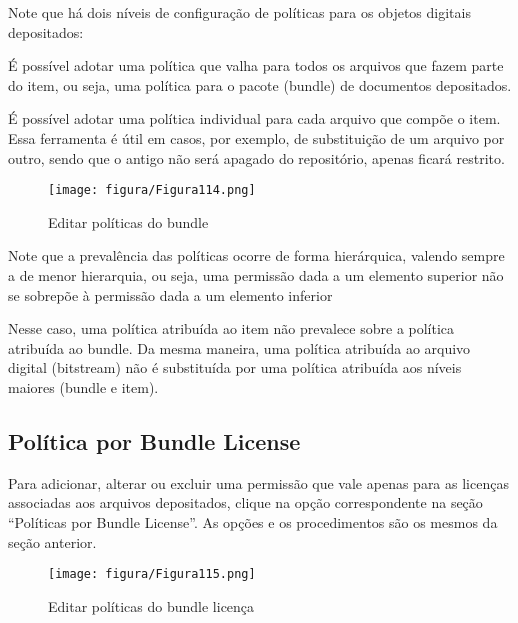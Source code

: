 \documentclass[12pt,hidelinks]{article}
\begin{document}
    \singlespacing
    
    Note que há dois níveis de configuração de políticas para os objetos digitais depositados:
    
    \singlespacing
    
    \textbullet \hspace{6pt} É possível adotar uma política que valha para todos os arquivos que fazem parte do item, ou seja, uma política para o pacote (bundle) de documentos depositados. 
    
    \singlespacing
    
    \textbullet \hspace{6pt} É possível adotar uma política individual para cada arquivo que compõe o item. Essa ferramenta é útil em casos, por exemplo, de substituição de um arquivo por outro, sendo que o antigo não será apagado do repositório, apenas ficará restrito.

    \begin{figure}[!htp]
                \centering
                \texttt{[image: figura/Figura114.png]}
                \caption{Editar políticas do bundle}
            \label{Rotulo}
        \end{figure}

    Note que a prevalência das políticas ocorre de forma hierárquica, valendo sempre a de menor hierarquia, ou seja, uma permissão dada a um elemento superior não se sobrepõe à permissão dada a um elemento inferior
    
    \singlespacing
    
    Nesse caso, uma política atribuída ao item não prevalece sobre a política atribuída ao bundle. Da  mesma maneira, uma política atribuída ao arquivo digital (bitstream) não é substituída por uma política atribuída aos níveis maiores (bundle e item).

\newpage

    \subsection{Política por Bundle License}
    
    Para adicionar, alterar ou excluir uma permissão que vale apenas para as licenças associadas aos arquivos depositados, clique na opção correspondente na seção “Políticas por Bundle License”. As opções e os procedimentos são os mesmos da seção anterior.
    
    \begin{figure}[!htp]
                \centering
                \texttt{[image: figura/Figura115.png]}
                \caption{Editar políticas do bundle licença}
            \label{Rotulo}
        \end{figure}
    
\end{document}
